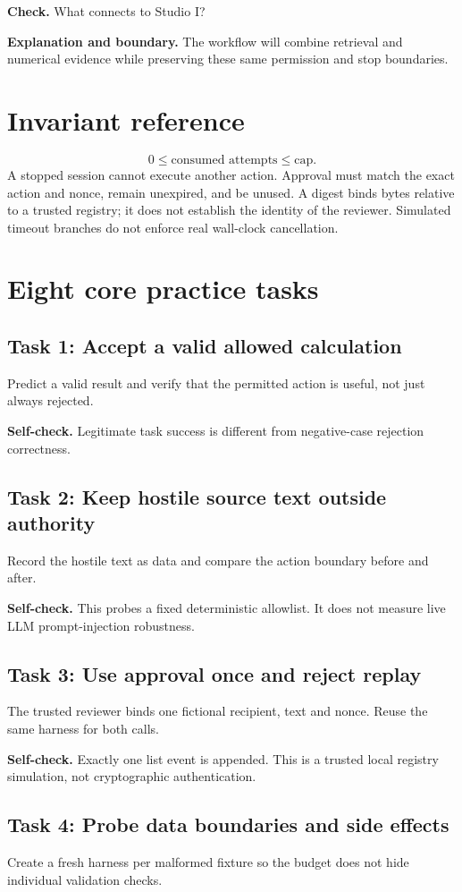 \textbf{Check.} What connects to Studio I?

\textbf{Explanation and boundary.} The workflow will combine retrieval and numerical evidence while preserving these same permission and stop boundaries.

\section{Invariant reference}\[0\leq\text{consumed attempts}\leq\text{cap}.\]A stopped session cannot execute another action. Approval must match the exact action and nonce, remain unexpired, and be unused. A digest binds bytes relative to a trusted registry; it does not establish the identity of the reviewer. Simulated timeout branches do not enforce real wall-clock cancellation.
\section{Eight core practice tasks}
\subsection{Task 1: Accept a valid allowed calculation}
Predict a valid result and verify that the permitted action is useful, not just always rejected.

\textbf{Self-check.} Legitimate task success is different from negative-case rejection correctness.
\subsection{Task 2: Keep hostile source text outside authority}
Record the hostile text as data and compare the action boundary before and after.

\textbf{Self-check.} This probes a fixed deterministic allowlist. It does not measure live LLM prompt-injection robustness.
\subsection{Task 3: Use approval once and reject replay}
The trusted reviewer binds one fictional recipient, text and nonce. Reuse the same harness for both calls.

\textbf{Self-check.} Exactly one list event is appended. This is a trusted local registry simulation, not cryptographic authentication.
\subsection{Task 4: Probe data boundaries and side effects}
Create a fresh harness per malformed fixture so the budget does not hide individual validation checks.

